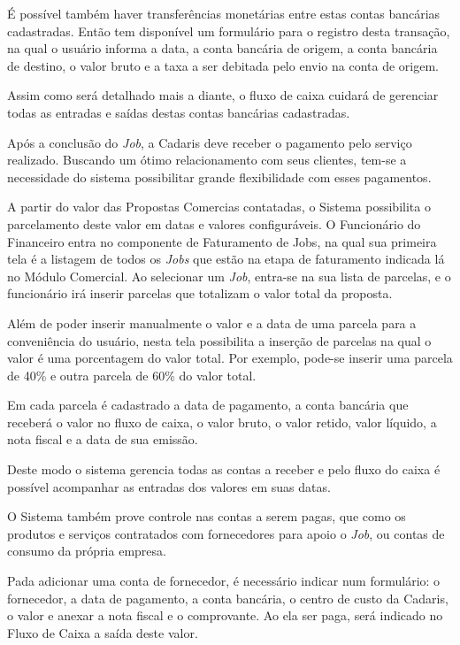 \documentclass[
  12pt,				%
  openany,
  oneside,
  a4paper,			%
  english,			%
  brazil
]{article}
\numberwithin{figure}{section}
\numberwithin{table}{section}
\newcounter{subsubsubsection}[subsubsection]
\begin{document}
É possível também haver transferências monetárias entre estas contas bancárias cadastradas. Então tem disponível um formulário para o registro desta transação, na qual o usuário informa a data, a conta bancária de origem, a conta bancária de destino, o valor bruto e a taxa a ser debitada pelo envio na conta de origem.

Assim como será detalhado mais a diante, o fluxo de caixa cuidará de gerenciar todas as entradas e saídas destas contas bancárias cadastradas.



Após a conclusão do \textit{Job}, a Cadaris deve receber o pagamento pelo serviço realizado. Buscando um ótimo relacionamento com seus clientes, tem-se a necessidade do sistema possibilitar grande flexibilidade com esses pagamentos. 

A partir do valor das Propostas Comercias contatadas, o Sistema possibilita o parcelamento deste valor em datas e valores configuráveis. O Funcionário do Financeiro entra no componente de Faturamento de Jobs, na qual sua primeira tela é a listagem de todos os \textit{Jobs} que estão na etapa de faturamento indicada lá no Módulo Comercial. Ao selecionar um \textit{Job}, entra-se na sua lista de parcelas, e o funcionário irá inserir parcelas que totalizam o valor total da proposta. 

Além de poder inserir manualmente o valor e a data de uma parcela para a conveniência do usuário, nesta tela possibilita a inserção de parcelas na qual o valor é uma porcentagem do valor total. Por exemplo, pode-se inserir uma parcela de 40\% e outra parcela de 60\% do valor total.

Em cada parcela é cadastrado a data de pagamento, a conta bancária que receberá o valor no fluxo de caixa, o valor bruto, o valor retido, valor líquido, a nota fiscal e a data de sua emissão.

Deste modo o sistema gerencia todas as contas a receber e pelo fluxo do caixa é possível acompanhar as entradas dos valores em suas datas.



O Sistema também prove controle nas contas a serem pagas, que como os produtos e serviços contratados com fornecedores para apoio o \textit{Job}, ou contas de consumo da própria empresa.

Pada adicionar uma conta de fornecedor, é necessário indicar num formulário: o fornecedor,  a data de pagamento, a conta bancária, o centro de custo da Cadaris, o valor e anexar a nota fiscal e o comprovante. Ao ela ser paga, será indicado no Fluxo de Caixa a saída deste valor.
\end{document}
